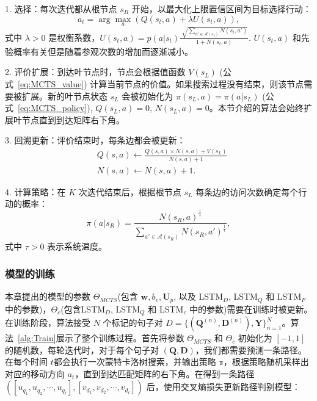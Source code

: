 1. 选择：每次迭代都从根节点 $s_R$ 开始，以最大化上限置信区间为目标选择行动：
\begin{equation}\label{eq:Selection}
  a_t = \arg\max_a (Q(s_t, a) + \lambda U(s_t, a)),
\end{equation}
式中 $\lambda >0$ 是权衡系数，$U(s_t, a) =  p(a|s_t)\frac{\sqrt[]{\sum_{a'\in\mathcal{A}(s_t)} N(s_t, a')}}{1 + N(s_t, a)}$. $U(s_t, a)$ 和先验概率有关但是随着参观次数的增加而逐渐减小。

2. 评价扩展：到达叶节点时，节点会根据值函数 $V(s_L)$ (公式~\ref{eq:MCTS_value}) 计算当前节点的价值。如果搜索过程没有结束，则该节点需要被扩展。新的叶节点状态 $s_L$ 会被初始化为 $\pi(s_L, a) =\pi(a|s_L)$ (公式~\ref{eq:MCTS_policy}), $Q(s_L, a)= 0$, $N(s_L, a) = 0$。本节介绍的算法会始终扩展叶节点直到到达矩阵右下角。

3. 回溯更新：评价结束时，每条边都会被更新：
\begin{equation}
\label{eq:UpdateQN}
\begin{aligned}
  &Q(s, a) \leftarrow  \frac{Q(s, a) \times N(s, a) + V(s_L)}{N(s, a) + 1}\\
  &N(s, a) \leftarrow  N(s, a) + 1.
\end{aligned}
\end{equation}

4. 计算策略：在 $K$ 次迭代结束后，根据根节点 $s_L$ 每条边的访问次数确定每个行动的概率：
\begin{equation}\label{eq:SearchProb}
\pi(a|s_R) = \frac{N(s_R, a)^{\frac{1}{\tau}}}{\sum_{a'\in\mathcal{A}(s_R)} N(s_R, a')^{\frac{1}{\tau}}},
\end{equation}
式中 $\tau > 0$ 表示系统温度。

\subsubsection{模型的训练}
本章提出的模型的参数 $\Theta_{MCTS}$(包含 $\mathbf{w}, b_v, \mathbf{U}_p$, 以及 LSTM$_D$, LSTM$_Q$ 和 LSTM$_F$中的参数)，$\Theta_{c}$(包含LSTM$_D$, LSTM$_Q$ 和 LSTM$_c$ 中的参数)需要在训练时被更新。在训练阶段，算法接受 $N$ 个标记的句子对 $D = \{ (\mathbf{Q}^{(n)}, \mathbf{D}^{(n)}), \mathbf{Y}\}_{n=1}^{N}$。算法~\ref{alg:Train}展示了整个训练过程。首先将参数  $\Theta_{MCTS}$ 和 $\Theta_{c}$ 初始化为 $[-1, 1]$ 的随机数，每轮迭代时，对于每个句子对 $(\mathbf{Q}, \mathbf{D})$，我们都需要预测一条路径。在每个时间 $t$都会执行一次蒙特卡洛树搜索，并输出策略 $\mathbb{\pi}$，根据策略随机采样出对应的移动方向 $a_t$，直到到达匹配矩阵的右下角。在得到一条路径 $([u_{q_1}, u_{q_2}, \cdots, u_{q_t}], [v_{d_1}, v_{d_2}, \cdots, v_{d_t}])$ 后，使用交叉熵损失更新路径判别模型：

